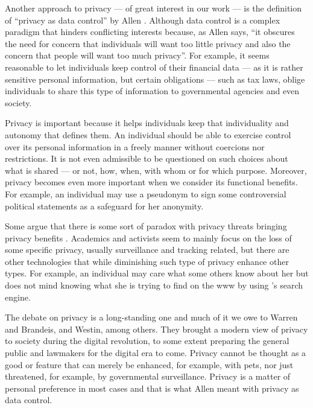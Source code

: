 Another approach to privacy --- of great interest in our work --- is the definition 
of ``privacy as data control'' by Allen \cite{Allen99}. Although data control is 
a complex paradigm that hinders conflicting interests because, as Allen says, ``it 
obscures the need for concern that individuals will want too little privacy and 
also the concern that people will want too much privacy''. For example, it seems 
reasonable to let individuals keep control of their financial data --- as it is 
rather sensitive personal information, but certain obligations --- such as tax laws, 
oblige individuals to share this type of information to governmental agencies and 
even society.

Privacy is important because it helps individuals keep that individuality and autonomy 
that defines them. An individual should be able to exercise control over its personal 
information in a freely manner without coercions nor restrictions. It is not even 
admissible to be questioned on such choices about what is shared --- or not, how, 
when, with whom or for which purpose. Moreover, privacy becomes even more important 
when we consider its functional benefits. For example, an individual may use a pseudonym 
to sign some controversial political statements as a safeguard for her anonymity.

Some argue that there is some sort of paradox with privacy threats bringing privacy 
benefits \cite{WittesL15}. Academics and activists seem to mainly focus on the loss 
of some specific privacy, usually surveillance and tracking related, but there are 
other technologies that while diminishing such type of privacy enhance other types. 
For example, an individual may care what some others know about her but does not 
mind \Google knowing what she is trying to find on the \ac{www} by using \Google's 
search engine.

The debate on privacy is a long-standing one and much of it we owe to Warren and 
Brandeis, and Westin, among others. They brought a modern view of privacy to society 
during the digital revolution, to some extent preparing the general public and lawmakers 
for the digital era to come. Privacy cannot be thought as a good or feature that 
can merely be enhanced, for example, with \acp{pet}, nor just threatened, for example, 
by governmental surveillance. Privacy is a matter of personal preference in most 
cases and that is what Allen meant with privacy as data control.

